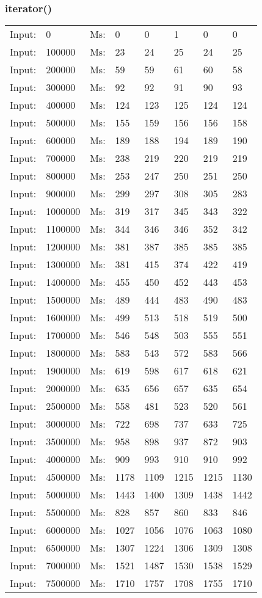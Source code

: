 \documentclass[11pt,a4paper]{report}
\begin{document}
\begin{tiny}
\subsubsection*{iterator()}
\begin{tabular}{l l ||l  l  l  l  l  l}
Input:&0&Ms:&0&0&1&0&0\\
Input:&100000&Ms:&23&24&25&24&25\\
Input:&200000&Ms:&59&59&61&60&58\\
Input:&300000&Ms:&92&92&91&90&93\\
Input:&400000&Ms:&124&123&125&124&124\\
Input:&500000&Ms:&155&159&156&156&158\\
Input:&600000&Ms:&189&188&194&189&190\\
Input:&700000&Ms:&238&219&220&219&219\\
Input:&800000&Ms:&253&247&250&251&250\\
Input:&900000&Ms:&299&297&308&305&283\\
Input:&1000000&Ms:&319&317&345&343&322\\
Input:&1100000&Ms:&344&346&346&352&342\\
Input:&1200000&Ms:&381&387&385&385&385\\
Input:&1300000&Ms:&381&415&374&422&419\\
Input:&1400000&Ms:&455&450&452&443&453\\
Input:&1500000&Ms:&489&444&483&490&483\\
Input:&1600000&Ms:&499&513&518&519&500\\
Input:&1700000&Ms:&546&548&503&555&551\\
Input:&1800000&Ms:&583&543&572&583&566\\
Input:&1900000&Ms:&619&598&617&618&621\\
Input:&2000000&Ms:&635&656&657&635&654\\
Input:&2500000&Ms:&558&481&523&520&561\\
Input:&3000000&Ms:&722&698&737&633&725\\
Input:&3500000&Ms:&958&898&937&872&903\\
Input:&4000000&Ms:&909&993&910&910&992\\
Input:&4500000&Ms:&1178&1109&1215&1215&1130\\
Input:&5000000&Ms:&1443&1400&1309&1438&1442\\
Input:&5500000&Ms:&828&857&860&833&846\\
Input:&6000000&Ms:&1027&1056&1076&1063&1080\\
Input:&6500000&Ms:&1307&1224&1306&1309&1308\\
Input:&7000000&Ms:&1521&1487&1530&1538&1529\\
Input:&7500000&Ms:&1710&1757&1708&1755&1710\\
\end{tabular}


\end{tiny}
\end{document}
